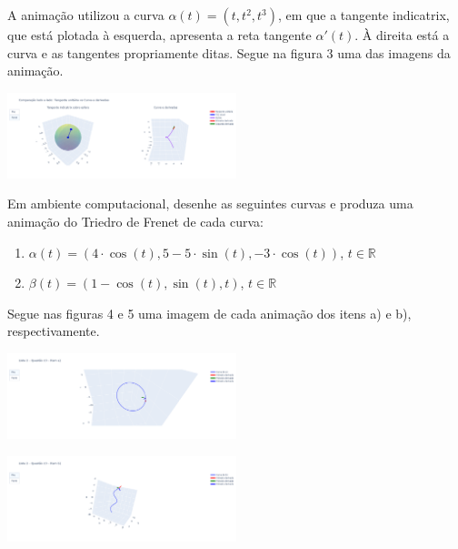 \documentclass[../main.tex]{subfiles}
\begin{document}
\begin{solucao}
	A animação utilizou a curva $\alpha(t)=(t,t^2,t^3)$, em que a tangente indicatrix, que está plotada à esquerda, apresenta a reta tangente $\alpha'(t)$. À direita está a curva e as tangentes propriamente ditas. Segue na figura 3 uma das imagens da animação.
	
	\begin{center}
		\includegraphics[width=0.5\textwidth]{imagens/lista02/picture_lista02_q09.png}
	\end{center}
\end{solucao}

\begin{exercicio}{13}
	Em ambiente computacional, desenhe as seguintes curvas e produza
	uma animação do Triedro de Frenet de cada curva:
	\begin{enumerate}[label=\alph*)]
		\item $\alpha(t)=(4\cdot \cos(t), 5-5\cdot \sin(t),-3\cdot \cos(t))$, $t\in \mathbb{R}$
		\item $\beta(t)=(1-\cos(t), \sin(t), t)$, $t\in \mathbb{R}$
	\end{enumerate}
\end{exercicio}

\begin{solucao}
	Segue nas figuras 4 e 5 uma imagem de cada animação dos itens a) e b), respectivamente.
	
	\begin{center}
		\includegraphics[width=0.5\textwidth]{imagens/lista02/picture_lista02_q13_item01.png}
	\end{center}
	\begin{center}
		\includegraphics[width=0.5\textwidth]{imagens/lista02/picture_lista02_q13_item02.png}
	\end{center}
\end{solucao}
\end{document}
